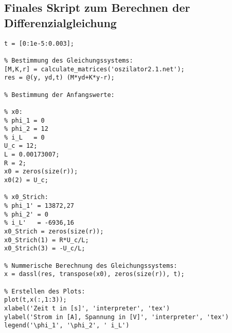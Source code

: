 \subsection*{Finales Skript zum Berechnen der Differenzialgleichung}
\begin{lstlisting}[caption={\texttt{FinalesSkript} in Octave}, label=finalesSkript]
t = [0:1e-5:0.003];

% Bestimmung des Gleichungssystems:
[M,K,r] = calculate_matrices('oszilator2.1.net');
res = @(y, yd,t) (M*yd+K*y-r);

% Bestimmung der Anfangswerte:

% x0:
% phi_1 = 0
% phi_2 = 12
% i_L   = 0
U_c = 12;
L = 0.00173007;
R = 2;
x0 = zeros(size(r));
x0(2) = U_c;

% x0_Strich: 
% phi_1' = 13872,27
% phi_2' = 0
% i_L'   = -6936,16
x0_Strich = zeros(size(r));
x0_Strich(1) = R*U_c/L;
x0_Strich(3) = -U_c/L;

% Nummerische Berechnung des Gleichungssystems:
x = dassl(res, transpose(x0), zeros(size(r)), t);

% Erstellen des Plots:
plot(t,x(:,1:3));
xlabel('Zeit t in [s]', 'interpreter', 'tex')
ylabel('Strom in [A], Spannung in [V]', 'interpreter', 'tex')
legend('\phi_1', '\phi_2', ' i_L')
\end{lstlisting}